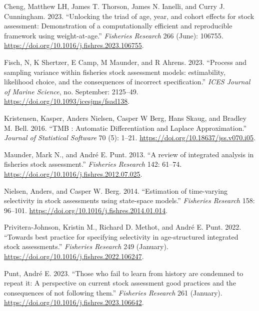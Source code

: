 \documentclass[
]{article}
\newlength{\cslhangindent}
\newlength{\cslentryspacingunit} %
\newenvironment{CSLReferences}[2] %
 {%
  \setlength{\parindent}{0pt}
  \ifodd #1
  \let\oldpar\par
  \def\par{\hangindent=\cslhangindent\oldpar}
  \fi
  \setlength{\parskip}{#2\cslentryspacingunit}
 }%
 {}
\begin{document}
\hypertarget{refs}{}
\begin{CSLReferences}{1}{0}
\leavevmode{}%
Cheng, Matthew LH, James T. Thorson, James N. Ianelli, and Curry J.
Cunningham. 2023. {``{Unlocking the triad of age, year, and cohort
effects for stock assessment: Demonstration of a computationally
efficient and reproducible framework using weight-at-age}.''}
\emph{Fisheries Research} 266 (June): 106755.
\url{https://doi.org/10.1016/j.fishres.2023.106755}.

\leavevmode{}%
Fisch, N, K Shertzer, E Camp, M Maunder, and R Ahrens. 2023. {``{Process
and sampling variance within fisheries stock assessment models:
estimability, likelihood choice, and the consequences of incorrect
specification}.''} \emph{ICES Journal of Marine Science}, no. September:
2125--49. \url{https://doi.org/10.1093/icesjms/fsad138}.

\leavevmode{}%
Kristensen, Kasper, Anders Nielsen, Casper W Berg, Hans Skaug, and
Bradley M. Bell. 2016. {``{TMB : Automatic Differentiation and Laplace
Approximation}.''} \emph{Journal of Statistical Software} 70 (5): 1--21.
\url{https://doi.org/10.18637/jss.v070.i05}.

\leavevmode{}%
Maunder, Mark N., and André E. Punt. 2013. {``{A review of integrated
analysis in fisheries stock assessment}.''} \emph{Fisheries Research}
142: 61--74. \url{https://doi.org/10.1016/j.fishres.2012.07.025}.

\leavevmode{}%
Nielsen, Anders, and Casper W. Berg. 2014. {``{Estimation of
time-varying selectivity in stock assessments using state-space
models}.''} \emph{Fisheries Research} 158: 96--101.
\url{https://doi.org/10.1016/j.fishres.2014.01.014}.

\leavevmode{}%
Privitera-Johnson, Kristin M., Richard D. Methot, and André E. Punt.
2022. {``{Towards best practice for specifying selectivity in
age-structured integrated stock assessments}.''} \emph{Fisheries
Research} 249 (January).
\url{https://doi.org/10.1016/j.fishres.2022.106247}.

\leavevmode{}%
Punt, André E. 2023. {``{Those who fail to learn from history are
condemned to repeat it: A perspective on current stock assessment good
practices and the consequences of not following them}.''}
\emph{Fisheries Research} 261 (January).
\url{https://doi.org/10.1016/j.fishres.2023.106642}.


\end{CSLReferences}
\end{document}
